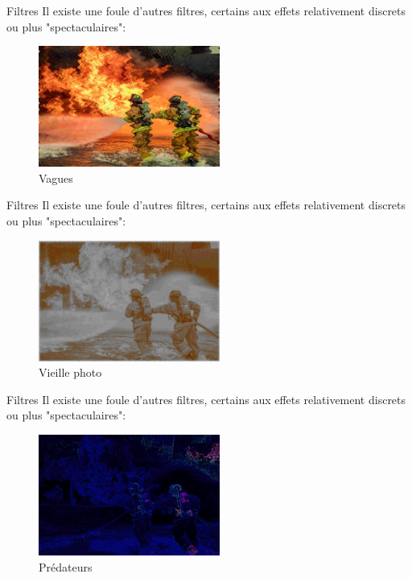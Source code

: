 \documentclass[10pt,svgnames,usenames,table]{beamer}
\begin{document}
\begin{frame}{Filtres}
		Il existe une foule d'autres filtres, certains aux effets relativement discrets ou plus "spectaculaires":
	
		\begin{figure}[H]
			\centering
				\includegraphics[height=150px]{Images/filters/ripples} 
				\caption{Vagues}
\end{figure}	
	\end{frame}

\begin{frame}{Filtres}
		Il existe une foule d'autres filtres, certains aux effets relativement discrets ou plus "spectaculaires":
	
		\begin{figure}[H]
			\centering
				\includegraphics[height=150px]{Images/filters/old} 
				\caption{Vieille photo}
\end{figure}	
	\end{frame}

\begin{frame}{Filtres}
		Il existe une foule d'autres filtres, certains aux effets relativement discrets ou plus "spectaculaires":
	
		\begin{figure}[H]
			\centering
				\includegraphics[height=150px]{Images/filters/predator} 
				\caption{Prédateurs}
\end{figure}	
	\end{frame}
\end{document}
